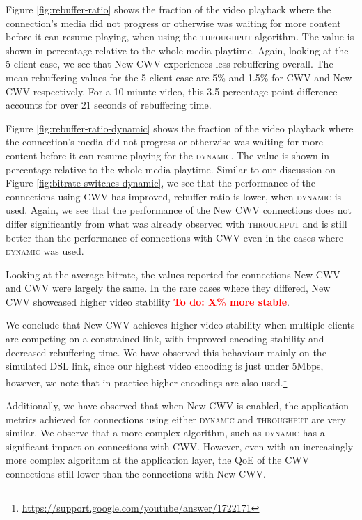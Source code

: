 \documentclass[10pt,sigconf]{acmart}
\newcommand{\todo}[1]{\textbf{\textcolor{red}{To do: #1}}}
\begin{document}
Figure \ref{fig:rebuffer-ratio} shows the fraction of the video playback where the connection's media did not progress or otherwise was waiting for more content before it can resume playing, when using the \textsc{throughput} algorithm. The value is shown in percentage relative to the whole media playtime. Again, looking at the 5 client case, we see that New CWV experiences less rebuffering overall. The mean rebuffering values for the 5 client case are 5\% and 1.5\% for CWV and New CWV respectively. For a 10 minute video, this 3.5 percentage point difference accounts for over 21 seconds of rebuffering time.

Figure \ref{fig:rebuffer-ratio-dynamic} shows the fraction of the video playback where the connection's media did not progress or otherwise was waiting for more content before it can resume playing for the \textsc{dynamic}. The value is shown in percentage relative to the whole media playtime. Similar to our discussion on Figure \ref{fig:bitrate-switches-dynamic}, we see that the performance of the connections using CWV has improved, rebuffer-ratio is lower, when \textsc{dynamic} is used. Again, we see that the performance of the New CWV connections does not differ significantly from what was already observed with \textsc{throughput} and is still better than the performance of connections with CWV even in the cases where \textsc{dynamic} was used.

Looking at the average-bitrate, the values reported for connections New CWV and CWV were largely the same. In the rare cases where they differed, New CWV showcased higher video stability \todo{X\% more stable}.


We conclude that New CWV achieves higher video stability when multiple clients are competing on a constrained link, with improved encoding stability and decreased rebuffering time. We have observed this behaviour mainly on the simulated DSL link, since our highest video encoding is just under 5Mbps, however, we note that in practice higher encodings are also used.\footnote{\url{https://support.google.com/youtube/answer/1722171}}

Additionally, we have observed that when New CWV is enabled, the application metrics achieved for connections using either \textsc{dynamic} and \textsc{throughput} are very similar. We observe that a more complex algorithm, such as \textsc{dynamic} has a significant impact on connections with CWV. However, even with an increasingly more complex algorithm at the application layer, the QoE of the CWV connections still lower than the connections with New CWV.
\end{document}
